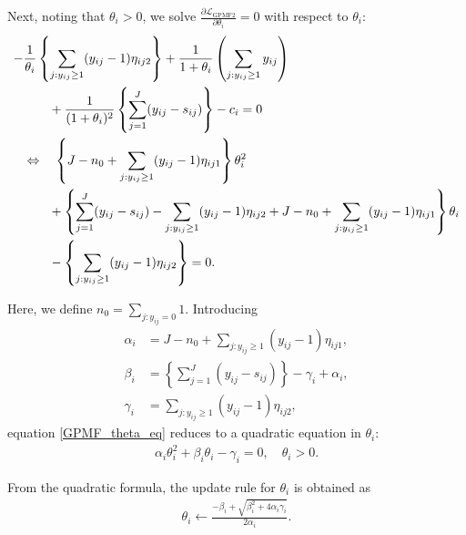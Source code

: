 \documentclass[pdflatex,sn-basic]{sn-jnl}%
\theoremstyle{thmstyleone}%
\theoremstyle{thmstyletwo}%
\theoremstyle{thmstylethree}%
\begin{document}
Next, noting that $\theta_{i}>0$, we solve 
$\tfrac{\partial \mathcal{L}_{\mathrm{GPMF2}}}{\partial \theta_{i}}=0$ 
with respect to $\theta_{i}$:
\begin{align}
	-&\frac{1}{\theta_{i}}\left\{\sum_{j:y_{ij}\ge 1}(y_{ij}-1)\eta_{ij2}\right\}
	+ \frac{1}{1+\theta_{i}}\left(\sum_{j:y_{ij}\ge 1}y_{ij}\right) \\
	&\qquad + \frac{1}{(1+\theta_{i})^{2}}\left\{\sum_{j=1}^{J}(y_{ij}-s_{ij})\right\} 
	- c_{i} = 0 \notag\\
	&\Leftrightarrow\quad\left\{ J - n_{0} + \sum_{j:y_{ij}\ge1}(y_{ij}-1)\eta_{ij1} \right\}\theta_{i}^{2}\\
	&\qquad +\left\{\sum_{j=1}^{J}(y_{ij}-s_{ij})-\sum_{j:y_{ij}\ge1}(y_{ij}-1)\eta_{ij2}
	+ J - n_{0} + \sum_{j:y_{ij}\ge1}(y_{ij}-1)\eta_{ij1} \right\}\theta_{i} \notag\\
	&\qquad - \left\{ \sum_{j:y_{ij}\ge1}(y_{ij}-1)\eta_{ij2} \right\} = 0.
	\label{GPMF_theta_eq}
\end{align}

Here, we define $n_{0}=\sum_{j:y_{ij}=0}1$. Introducing
\begin{align*}
	\alpha_{i} &= J-n_{0}+\sum_{j:y_{ij}\ge1}(y_{ij}-1)\eta_{ij1}, \\
	\beta_{i}  &= \left\{\sum_{j=1}^{J}(y_{ij}-s_{ij})\right\}-\gamma_{i}+\alpha_{i}, \\
	\gamma_{i} &= \sum_{j:y_{ij}\ge1}(y_{ij}-1)\eta_{ij2},
\end{align*}
equation \eqref{GPMF_theta_eq} reduces to a quadratic equation in $\theta_{i}$:
\begin{align}
	\alpha_{i}\theta_{i}^{2} + \beta_{i}\theta_{i} - \gamma_{i} = 0,\quad \theta_{i}>0.
\end{align}

From the quadratic formula, the update rule for $\theta_{i}$ is obtained as
\begin{align}
	\theta_{i} \leftarrow \frac{-\beta_{i}+\sqrt{\beta_{i}^{2}+4\alpha_{i}\gamma_{i}}}{2\alpha_{i}}.
	\label{update_GPMF_theta}
\end{align}
\end{document}
